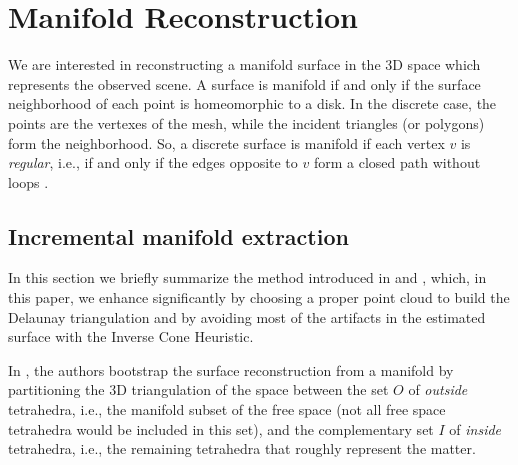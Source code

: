 \section{Manifold Reconstruction}%
\label{sec:manifold}
We are interested in reconstructing a manifold surface in the 3D space which represents the observed scene.
A surface is manifold if and only if the surface neighborhood of each point is homeomorphic to a disk.
In the discrete case, the points are the vertexes of the mesh, while the incident triangles (or polygons) form the neighborhood. 
So, a discrete surface is manifold if each vertex $v$ is \emph{regular}, i.e., if and only if the edges opposite to $v$ form a closed path without loops \cite{lhuillier_Yu2013}. 

\subsection{Incremental manifold extraction}
\label{subsec:incrementalManifold_2}
In this section we briefly summarize the method introduced in \cite{litvinov_lhuillier_13} and \cite{litvinov_Lhiuller14}, which, in this paper, we enhance significantly by choosing a proper point cloud to build the Delaunay triangulation and by avoiding most  of the artifacts in the estimated surface with the Inverse Cone Heuristic.

In \cite{litvinov_lhuillier_13}, the authors bootstrap the surface reconstruction from a manifold by partitioning the 3D triangulation of the space between the set $O$ of \emph{outside} tetrahedra, i.e., the manifold subset of the free space (not all free space tetrahedra would be included in this set), and the complementary set $I$ of \emph{inside} tetrahedra, i.e., the remaining tetrahedra that roughly represent the matter.


